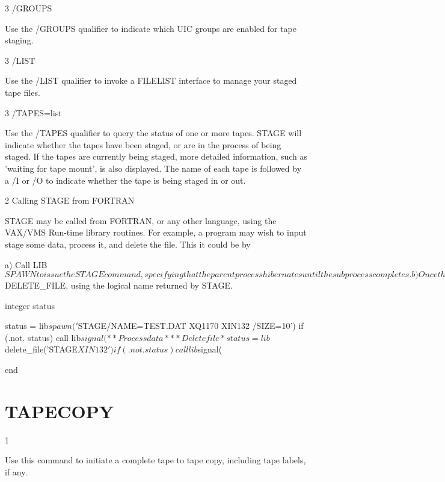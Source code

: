 \begin{XMP}
3 /GROUPS

Use the /GROUPS qualifier to indicate which UIC groups are enabled
for tape staging.

3 /LIST

Use the /LIST qualifier to invoke a FILELIST interface to manage
your staged tape files.

3 /TAPES=list

Use the /TAPES qualifier to query the status of one or more tapes.
STAGE will indicate whether the tapes have been staged, or are in
the process of being staged. If the tapes are currently being staged,
more detailed information, such as 'waiting for tape mount', is also
displayed. The name of each tape is followed by a /I or /O to indicate
whether the tape is being staged in or out.

2 Calling STAGE from FORTRAN

STAGE may be called from FORTRAN, or any other language, using
the VAX/VMS Run-time library routines. For example, a program
may wish to input stage some data, process it, and delete the file.
This it could be by

a) Call LIB$SPAWN to issue the STAGE command, specifying that the
parent process hibernates until the subprocess completes.

b) Once the subprocess has completed, the data will have been staged to
disk, unless a error code is returned.

c) The program can then continue to process this data.

d) Once processing has completed, it can delete the staged file using
LIB$DELETE_FILE, using the logical name returned by STAGE.

      integer status

      status = lib$spawn('$STAGE/NAME=TEST.DAT XQ1170 XIN132 /SIZE=10')
      if (.not. status) call lib$signal(%

*
*      Process data
*

*
*      Delete file
*
      status = lib$delete_file('STAGE$XIN132')
      if (.not. status) call lib$signal(%

      end

\section{TAPECOPY}
1 

Use this command to initiate a complete tape to tape copy,
including tape labels, if any.


\end{XMP}
